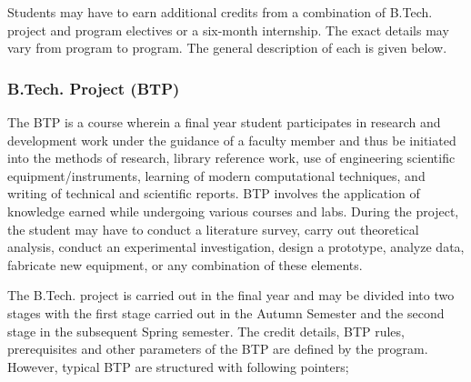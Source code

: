 Students may have to earn additional credits from a combination of B.Tech. project and program electives or a six-month internship. The exact details may vary from program to program. The general description of each is given below.

\subsubsection{B.Tech. Project (BTP)}

The BTP is a course wherein a final year student participates in research and development work under the guidance of a faculty member and thus be initiated into the methods of research, library reference work, use of engineering scientific equipment/instruments, learning of modern computational techniques, and writing of technical and scientific reports. BTP involves the application of knowledge earned while undergoing various courses and labs. During the project, the student may have to conduct a literature survey, carry out theoretical analysis, conduct an experimental investigation, design a prototype, analyze data, fabricate new equipment, or any combination of these elements.

The B.Tech. project is carried out in the final year and may be divided into two stages with the first stage carried out in the Autumn Semester and the second stage in the subsequent Spring semester. The credit details, BTP rules, prerequisites and other parameters of the BTP are defined by the program. However, typical BTP are structured with following pointers; 

